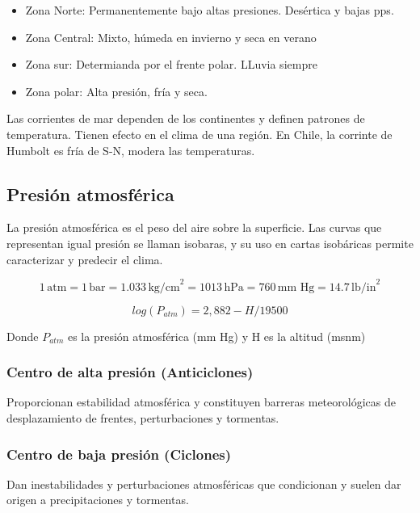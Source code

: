 \begin{itemize}
    \item Zona Norte: Permanentemente bajo altas presiones. Desértica y bajas pps. 
    \item Zona Central: Mixto, húmeda en invierno y seca en verano
    \item Zona sur: Determianda por el frente polar. LLuvia siempre
    \item Zona polar: Alta presión, fría y seca. 
\end{itemize}

Las corrientes de mar dependen de los continentes y definen patrones de temperatura. Tienen efecto en el clima de una región.
En Chile, la corrinte de Humbolt es fría de S-N, modera las temperaturas.

\subsection{Presión atmosférica}

La presión atmosférica es el peso del aire sobre la superficie. Las curvas que representan igual presión se llaman isobaras, y su uso en cartas isobáricas permite caracterizar y predecir el clima.

\[
1 \, \text{atm} = 1 \, \text{bar} = 1.033 \, \text{kg/cm}^2 = 1013 \, \text{hPa} = 760 \, \text{mm Hg} = 14.7 \, \text{lb/in}^2
\]

\begin{equation}
    log(P_{atm}) = 2,882 - H/19500
\end{equation}

Donde $P_{atm}$ es la presión atmosférica (mm Hg) y H es la altitud (msnm)

\subsubsection{Centro de alta presión (Anticiclones)}

Proporcionan estabilidad atmosférica y constituyen barreras meteorológicas de desplazamiento de frentes, perturbaciones y tormentas.

\subsubsection{Centro de baja presión (Ciclones)}

Dan inestabilidades y perturbaciones atmosféricas que condicionan y suelen dar origen a precipitaciones y tormentas.

